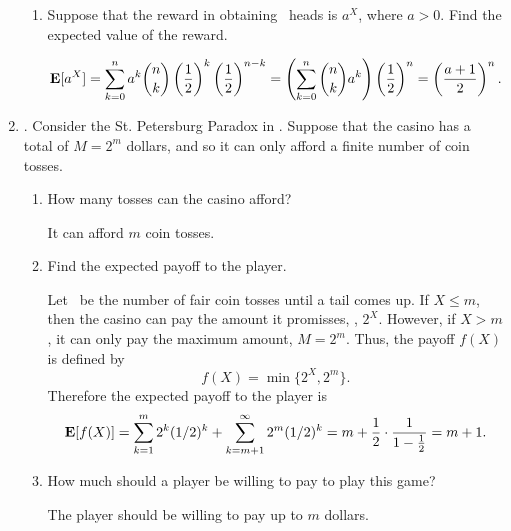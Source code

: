 \begin{enumerate}
\begin{enumerate}
		\item Suppose that the reward in obtaining \X\ heads is $a^X$,
		where $a > 0$. Find the expected value of the reward.
		\ifdefined\sol
		\begin{solution}
		\[
			{\bf E}[a^X] = \sum_{k=0}^{n} a^k {n\choose k}
			\left(\frac{1}{2}\right)^k
			\left(\frac{1}{2}\right)^{n-k}
			= \left( \sum_{k=0}^{n} {n\choose k}a^k  \right)
			\left(\frac{1}{2}\right)^n
			= \left(\frac{a+1}{2}\right)^n.
		\]
		\end{solution}
		\fi
	\end{enumerate}

	\item {}.
	Consider the St. Petersburg Paradox in .
	Suppose that the casino has a total of $M = 2^m$ dollars,
	and so it can only afford a finite number of coin tosses.
	\begin{enumerate}
		\item How many tosses can the casino afford?
		\ifdefined\sol
		\begin{solution}
			It can afford $m$ coin tosses.
		\end{solution}
		\fi

		\item Find the expected payoff to the player.
		\ifdefined\sol
		\begin{solution}
			Let \X\ be the number of fair coin tosses
			until a tail comes up.
			If $X\leq m$,
			then the casino can pay the amount it promisses,
			\ie, $2^X$.
			However, if $X>m$, it can only pay the maximum amount, $M=2^m$.
			Thus, the payoff $f(X)$ is defined by
			\[
				f(X) = \min\{2^X,2^m\}.
			\]
			Therefore the expected payoff to the player is
			\[
				{\bf E}[f(X)] = \sum_{k=1}^{m} 2^k (1/2)^k + \sum_{k=m+1}^{\infty} 2^m (1/2)^k
				=  m + \frac{1}{2} \cdot \frac{1}{1-\frac{1}{2}}
				= m + 1.
			\]
		\end{solution}
		\fi

		\item How much should a player be willing to pay to play this game?
		\ifdefined\sol
		\begin{solution}
			The player should be willing to pay up to $m$ dollars.
		\end{solution}
		\fi

	\end{enumerate}


\end{enumerate}





